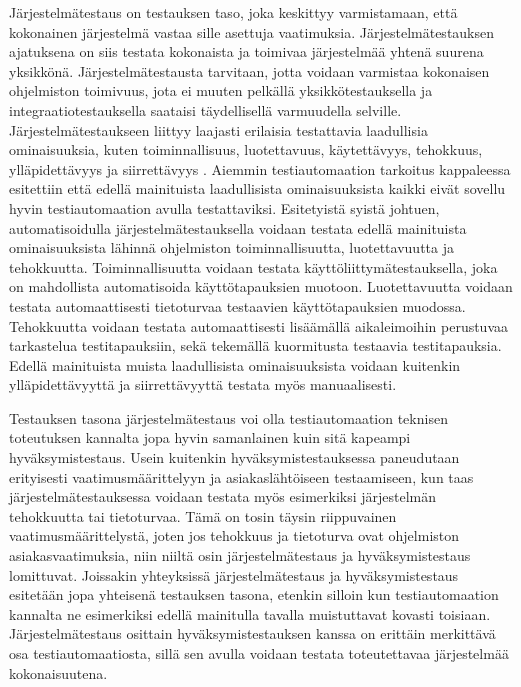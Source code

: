     Järjestelmätestaus on testauksen taso, joka keskittyy varmistamaan, että kokonainen järjestelmä vastaa sille asettuja vaatimuksia.
    Järjestelmätestauksen ajatuksena on siis testata kokonaista ja toimivaa järjestelmää yhtenä suurena yksikkönä.
    Järjestelmätestausta tarvitaan, jotta voidaan varmistaa kokonaisen ohjelmiston toimivuus, jota ei muuten pelkällä yksikkötestauksella ja integraatiotestauksella saataisi täydellisellä varmuudella selville.
    Järjestelmätestaukseen liittyy laajasti erilaisia testattavia laadullisia ominaisuuksia, kuten toiminnallisuus, luotettavuus, käytettävyys, tehokkuus, ylläpidettävyys ja siirrettävyys \cite{iso_quality_attributes}.
    Aiemmin testiautomaation tarkoitus kappaleessa esitettiin että edellä mainituista laadullisista ominaisuuksista kaikki eivät sovellu hyvin testiautomaation avulla testattaviksi.
    Esitetyistä syistä johtuen, automatisoidulla järjestelmätestauksella voidaan testata edellä mainituista ominaisuuksista lähinnä ohjelmiston toiminnallisuutta, luotettavuutta ja tehokkuutta.
    Toiminnallisuutta voidaan testata käyttöliittymätestauksella, joka on mahdollista automatisoida käyttötapauksien muotoon.
    Luotettavuutta voidaan testata automaattisesti tietoturvaa testaavien käyttötapauksien muodossa.
    Tehokkuutta voidaan testata automaattisesti lisäämällä aikaleimoihin perustuvaa tarkastelua testitapauksiin, sekä tekemällä kuormitusta testaavia testitapauksia.
    Edellä mainituista muista laadullisista ominaisuuksista voidaan kuitenkin ylläpidettävyyttä ja siirrettävyyttä testata myös manuaalisesti. \cite{istqb_glossary_v3_3} \cite{testing_levels_webpage}

    Testauksen tasona järjestelmätestaus voi olla testiautomaation teknisen toteutuksen kannalta jopa hyvin samanlainen kuin sitä kapeampi hyväksymistestaus.
    Usein kuitenkin hyväksymistestauksessa paneudutaan erityisesti vaatimusmäärittelyyn ja asiakaslähtöiseen testaamiseen, kun taas järjestelmätestauksessa voidaan testata myös esimerkiksi järjestelmän tehokkuutta tai tietoturvaa.
    Tämä on tosin täysin riippuvainen vaatimusmäärittelystä, joten jos tehokkuus ja tietoturva ovat ohjelmiston asiakasvaatimuksia, niin niiltä osin järjestelmätestaus ja hyväksymistestaus lomittuvat.
    Joissakin yhteyksissä järjestelmätestaus ja hyväksymistestaus esitetään jopa yhteisenä testauksen tasona, etenkin silloin kun testiautomaation kannalta ne esimerkiksi edellä mainitulla tavalla muistuttavat kovasti toisiaan.
    Järjestelmätestaus osittain hyväksymistestauksen kanssa on erittäin merkittävä osa testiautomaatiosta, sillä sen avulla voidaan testata toteutettavaa järjestelmää kokonaisuutena.

